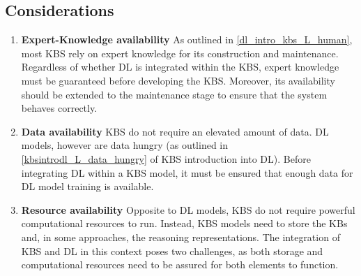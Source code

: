\subsection*{Considerations}
\begin{enumerate} [start=1,label={\bfseries C\arabic*.}]
    \item \textbf{Expert-Knowledge availability}\label{dlintrokbs_C_expert} As outlined in \ref{dl_intro_kbs_L_human}, most KBS rely on expert knowledge for its construction and maintenance. Regardless of whether DL is integrated within the KBS, expert knowledge must be guaranteed before developing the KBS. Moreover, its availability should be extended to the maintenance stage to ensure that the system behaves correctly.
    
    \item \textbf{Data availability}\label{dlintrokbs_C_data} KBS do not require an elevated amount of data. DL models, however are data hungry (as outlined in \ref{kbsintrodl_L_data_hungry} of KBS introduction into DL). Before integrating DL within a KBS model, it must be ensured that enough data for DL model training is available. 
    
    \item \textbf{Resource availability}\label{dlintrokbs_C_resource} Opposite to DL models, KBS do not require powerful computational resources to run. Instead, KBS models need to store the KBs and, in some approaches, the reasoning representations. The integration of KBS and DL in this context poses two challenges, as both storage and computational resources need to be assured for both elements to function.
\end{enumerate}
